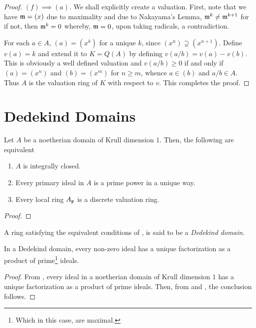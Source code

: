 \begin{proof}
    $(f)\implies(a)$. We shall explicitly create a valuation. First, note that we have $\mathfrak m = (x)$ due to maximality and due to Nakayama's Lemma, $\mathfrak m^k\ne\mathfrak m^{k + 1}$ for if not, then $\mathfrak m^k = 0$ whereby, $\mathfrak m = 0$, upon taking radicals, a contradiction. 

    For each $a\in A$, $(a) = (x^k)$ for a unique $k$, since $(x^n)\supsetneq(x^{n + 1})$. Define $v(a) = k$ and extend it to $K = Q(A)$ by defining $v(a/b) = v(a) - v(b)$. This is obviously a well defined valuation and $v(a/b)\ge 0$ if and only if $(a) = (x^n)$ and $(b) = (x^m)$ for $n\ge m$, whence $a\in (b)$ and $a/b\in A$. Thus $A$ is the valuation ring of $K$ with respect to $v$. This completes the proof.
\end{proof}

\section{Dedekind Domains}

\begin{theorem}
    Let $A$ be a noetherian domain of Krull dimension $1$. Then, the following are equivalent 
    \begin{enumerate}[label=(\alph*)]
        \item $A$ is integrally closed.
        \item Every primary ideal in $A$ is a prime power in a unique way.
        \item Every local ring $A_\mathfrak p$ is a discrete valuation ring.
    \end{enumerate}
\end{theorem}
\begin{proof}
\end{proof}

\begin{definition}
    A ring satisfying the equivalent conditions of , is said to be a \emph{Dedekind domain}.
\end{definition}

\begin{theorem}
    In a Dedekind domain, every non-zero ideal has a unique factorization as a product of prime\footnote{Which in this case, are maximal.} ideals.
\end{theorem}
\begin{proof}
    From , every ideal in a noetherian domain of Krull dimension $1$ has a unique factorization as a product of prime ideals. Then, from  and , the conclusion follows.
\end{proof}

